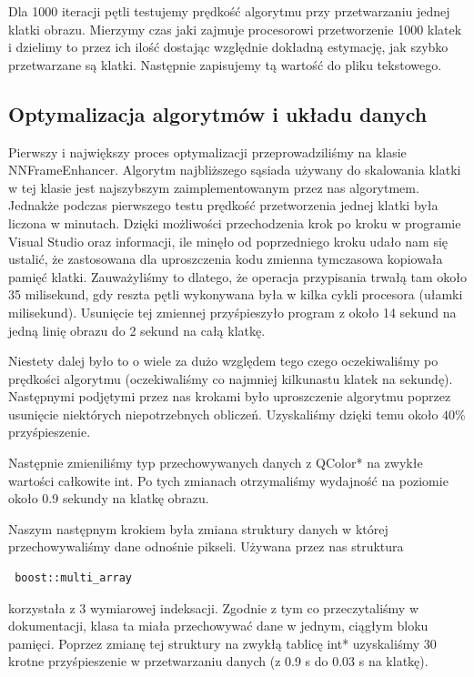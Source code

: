 \documentclass[twoside]{projektInzynierskiMS}
\begin{document}
Dla 1000 iteracji pętli testujemy prędkość algorytmu przy przetwarzaniu jednej klatki obrazu. Mierzymy czas jaki zajmuje procesorowi przetworzenie 1000 klatek i dzielimy to przez ich ilość dostając względnie dokładną estymację, jak szybko przetwarzane są klatki.
Następnie zapisujemy tą wartość do pliku tekstowego.

\subsection{Optymalizacja algorytmów i układu danych}
Pierwszy i największy proces optymalizacji przeprowadziliśmy na klasie NNFrameEnhancer. Algorytm najbliższego sąsiada używany do skalowania klatki w tej klasie jest najszybszym zaimplementowanym przez nas algorytmem. Jednakże podczas pierwszego testu prędkość przetworzenia jednej klatki była liczona w minutach. Dzięki możliwości przechodzenia krok po kroku w programie Visual Studio oraz informacji, ile minęło od poprzedniego kroku udało nam się ustalić, że zastosowana dla uproszczenia kodu zmienna tymczasowa kopiowała pamięć klatki. Zauważyliśmy to dlatego, że operacja przypisania trwałą tam około 35 milisekund, gdy reszta pętli wykonywana była w kilka cykli procesora (ułamki milisekund). Usunięcie tej zmiennej przyśpieszyło program z około 14 sekund na jedną linię obrazu do 2 sekund na całą klatkę.

Niestety dalej było to o wiele za dużo względem tego czego oczekiwaliśmy po prędkości algorytmu (oczekiwaliśmy co najmniej kilkunastu klatek na sekundę). Następnymi podjętymi przez nas krokami było uproszczenie algorytmu poprzez usunięcie niektórych niepotrzebnych obliczeń. Uzyskaliśmy dzięki temu około $40\%$ przyśpieszenie. 

Następnie zmieniliśmy typ przechowywanych danych z QColor* na zwykłe wartości całkowite int. Po tych zmianach otrzymaliśmy wydajność na poziomie około 0.9 sekundy na klatkę obrazu. 

Naszym następnym krokiem była zmiana struktury danych w której przechowywaliśmy dane odnośnie pikseli. Używana przez nas struktura \begin{verbatim} boost::multi_array \end{verbatim} korzystała z 3 wymiarowej indeksacji. Zgodnie z tym co przeczytaliśmy w dokumentacji, klasa ta miała przechowywać dane w jednym, ciągłym bloku pamięci. Poprzez zmianę tej struktury na zwykłą tablicę int* uzyskaliśmy 30 krotne przyśpieszenie w przetwarzaniu danych (z 0.9 s do 0.03 s na klatkę).
\end{document}
